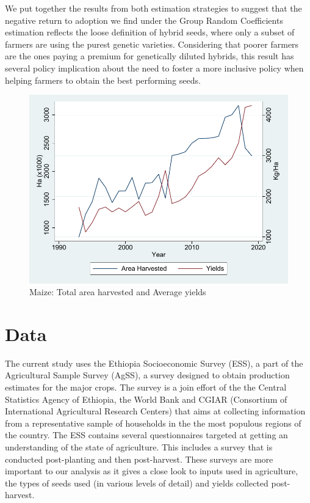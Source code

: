 \documentclass{article}
\begin{document}
We put together the results from both estimation strategies to suggest that the negative return to adoption we find under the Group Random Coefficients estimation reflects the loose definition of hybrid seeds, where only a subset of farmers are using the purest genetic varieties. Considering that poorer farmers are the ones paying a premium for genetically diluted hybrids, this result has several policy implication about the need to foster a more inclusive policy when helping farmers to obtain the best performing seeds. 


\begin{figure}[H]
    \centering
    \caption{Maize: Total area harvested and Average yields}    \includegraphics{results/figures/Maize_yields.pdf}
    
    \label{fig:maize_yields}
\end{figure}



\section{Data}

The current study uses the Ethiopia Socioeconomic Survey (ESS), a part of the Agricultural Sample Survey (AgSS), a survey designed to obtain production estimates for the major crops. The survey is a join effort of the the Central Statistics Agency of Ethiopia, the World Bank and CGIAR (Consortium of International Agricultural Research Centers) \citep{kosmowski2020shining} that aims at collecting information from a representative sample of households in the  the most populous regions of the country. The ESS contains several questionnaires targeted at getting an understanding of the state of agriculture. This includes a survey that is conducted post-planting and then post-harvest. These surveys are more important to our analysis as it gives a close look to inputs used in agriculture, the types of seeds used (in various levels of detail) and yields collected post-harvest.
\end{document}
